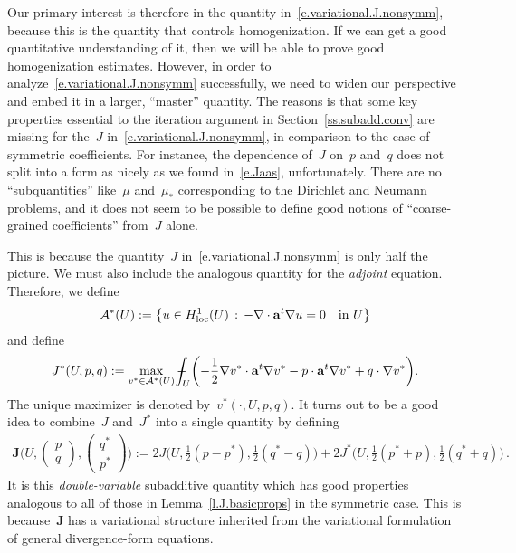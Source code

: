 \documentclass[11pt]{article} %
\numberwithin{equation}{section}
\theoremstyle{definition}
\let\originalleft\left
\let\originalright\right
\renewcommand{\left}{\mathopen{}\mathclose\bgroup\originalleft}
\renewcommand{\right}{\aftergroup\egroup\originalright}
\renewcommand{\a}{\mathbf{a}}
\def\Xint#1{\mathchoice
{\XXint\displaystyle\textstyle{#1}}%
{\XXint\textstyle\scriptstyle{#1}}%
{\XXint\scriptstyle\scriptscriptstyle{#1}}%
{\XXint\scriptscriptstyle\scriptscriptstyle{#1}}%
\!\int}
\def\XXint#1#2#3{{\setbox0=\hbox{$#1{#2#3}{\int}$}
\vcenter{\hbox{$#2#3$}}\kern-.5\wd0}}
\def\fint{\Xint-}
\newcommand{\bfJ}{\mathbf{J}}
\begin{document}
\smallskip

Our primary interest is therefore in the quantity in~\eqref{e.variational.J.nonsymm}, because this is the quantity that controls homogenization. If we can get a good quantitative understanding of it, then we will be able to prove good homogenization estimates. However, in order to analyze~\eqref{e.variational.J.nonsymm} successfully, we need to widen our perspective and embed it in a larger, ``master'' quantity. 
The reasons is that some key properties essential to the iteration argument in Section~\ref{ss.subadd.conv} are missing for the~$J$ in~\eqref{e.variational.J.nonsymm}, in comparison to the case of symmetric coefficients. For instance, the dependence of~$J$ on~$p$ and~$q$ does not split into a form as nicely as we found in~\eqref{e.Jaas}, unfortunately. There are no ``subquantities'' like~$\mu$ and~$\mu_*$ corresponding to the Dirichlet and Neumann problems, and it does not seem to be possible to define good notions of ``coarse-grained coefficients''  from~$J$ alone. 

\smallskip

This is because the quantity~$J$ in~\eqref{e.variational.J.nonsymm} is only half the picture. We must also include the analogous quantity for the \emph{adjoint} equation. Therefore, we define
\begin{equation}
\label{e.def.AsU}
\mathcal{A}^*(U) := 
\left\{ 
u\in H^1_{\mathrm{loc}}(U)
\,:\,
-\nabla \cdot \a^t\nabla u = 0 \quad \mbox{in} \ U \right\}
\end{equation}
and define
\begin{equation}
\label{e.variational.J.nonsymm.dual}
J^*(U,p,q) 
:= 
\max_{v^*\in \mathcal{A}^*(U)} 
\fint_U \left( -\frac12 \nabla v^*\cdot \a^t\nabla v^* -p\cdot \a^t\nabla v^* + q\cdot \nabla v^*   \right).
\end{equation}
The unique maximizer is denoted by~$v^*(\cdot,U,p,q)$. 
It turns out to be a good idea to combine~$J$ and~$J^*$ into a single quantity by defining
\begin{align}
\label{e.bfJ}
\bfJ
\biggl(U, \begin{pmatrix} p  \\ q \end{pmatrix}, \begin{pmatrix} q^* \\ p^* \end{pmatrix} \biggr)
:=
2J\bigl(U,\tfrac12(p-p^*),\tfrac12(q^*-q)\bigr)
+ 
2J^*\bigl(U,\tfrac12(p^*+p),\tfrac12(q^*+q)\bigr)
\,.
\end{align}
It is this \emph{double-variable} subadditive quantity which has good properties analogous to all of those in Lemma~\ref{l.J.basicprops} in the symmetric case. This is because~$\bfJ$ has a variational structure inherited from the variational formulation of general divergence-form equations.
\end{document}
